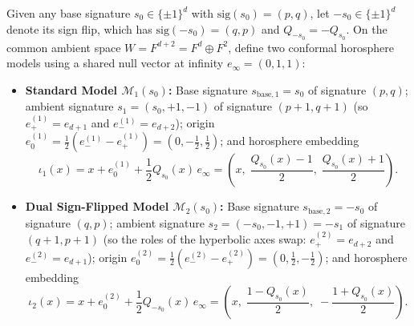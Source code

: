 \documentclass[11pt]{article}
\theoremstyle{definition}
\newcommand{\sig}{\mathrm{sig}}
\begin{document}
Given any base signature $s_0 \in \{\pm 1\}^d$ with $\sig(s_0) = (p, q)$, let $-s_0 \in \{\pm 1\}^d$ denote its sign flip, which has $\sig(-s_0) = (q, p)$ and $Q_{-s_0} = -Q_{s_0}$. On the common ambient space $W = F^{d+2} = F^d \oplus F^2$, define two conformal horosphere models using a shared null vector at infinity $e_\infty = (0, 1, 1)$:
\begin{itemize}
  \item \textbf{Standard Model $\mathcal{M}_1(s_0)$:} Base signature $s_{\mathrm{base},1} = s_0$ of signature $(p, q)$; ambient signature $s_1 = (s_0, +1, -1)$ of signature $(p + 1, q + 1)$ (so $e_+^{(1)} = e_{d+1}$ and $e_-^{(1)} = e_{d+2}$); origin $e_0^{(1)} = \frac{1}{2}(e_-^{(1)} - e_+^{(1)}) = (0, -\frac{1}{2}, \frac{1}{2})$; and horosphere embedding
  \begin{equation}\label{eq:iota1}
    \iota_1(x) = x + e_0^{(1)} + \frac{1}{2} Q_{s_0}(x)\, e_\infty
    = \left(x,\; \frac{Q_{s_0}(x) - 1}{2},\; \frac{Q_{s_0}(x) + 1}{2}\right).
  \end{equation}
  \item \textbf{Dual Sign-Flipped Model $\mathcal{M}_2(s_0)$:} Base signature $s_{\mathrm{base},2} = -s_0$ of signature $(q, p)$; ambient signature $s_2 = (-s_0, -1, +1) = -s_1$ of signature $(q + 1, p + 1)$ (so the roles of the hyperbolic axes swap: $e_+^{(2)} = e_{d+2}$ and $e_-^{(2)} = e_{d+1}$); origin $e_0^{(2)} = \frac{1}{2}(e_-^{(2)} - e_+^{(2)}) = (0, \frac{1}{2}, -\frac{1}{2})$; and horosphere embedding
  \begin{equation}\label{eq:iota2}
    \iota_2(x) = x + e_0^{(2)} + \frac{1}{2} Q_{-s_0}(x)\, e_\infty
    = \left(x,\; \frac{1 - Q_{s_0}(x)}{2},\; -\frac{1 + Q_{s_0}(x)}{2}\right).
  \end{equation}
\end{itemize}
\end{document}
